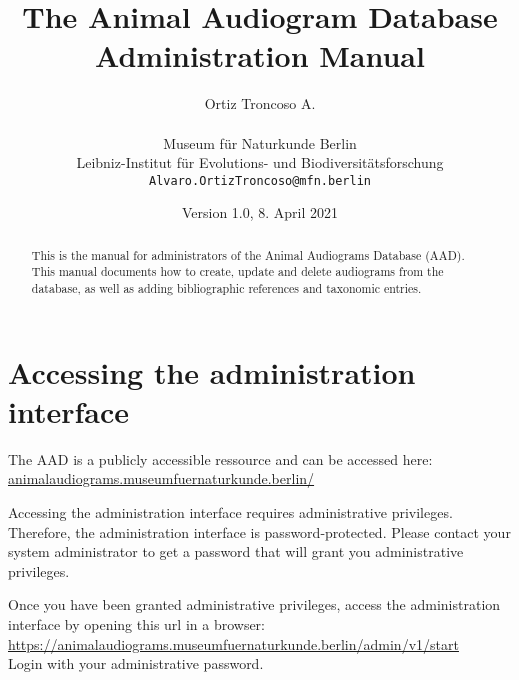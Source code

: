 \documentclass{article}
\begin{document}
\title{The Animal Audiogram Database Administration Manual}
\author{Ortiz Troncoso A.\\ \\
  Museum f{\"u}r Naturkunde Berlin\\Leibniz-Institut f{\"u}r Evolutions- und Biodiversitätsforschung\\
  \texttt{Alvaro.OrtizTroncoso@mfn.berlin}
}
\date{Version 1.0, 8. April 2021}

\maketitle

\begin{abstract}
  This is the manual for administrators of the Animal Audiograms Database (AAD). This manual documents how to create, update and delete audiograms from the database, as well as adding bibliographic references and taxonomic entries.
\end{abstract}

\newpage
\tableofcontents
\newpage

\section{Accessing the administration interface}
The AAD is a publicly accessible ressource and can be accessed here:\\ \url{animalaudiograms.museumfuernaturkunde.berlin/}

Accessing the administration interface requires administrative privileges. Therefore, the administration interface is password-protected. Please contact your system administrator to get a password that will grant you administrative privileges.

Once you have been granted administrative privileges, access the administration interface by opening this url in a browser:\\
\url{https://animalaudiograms.museumfuernaturkunde.berlin/admin/v1/start}\\
Login with your administrative password.


\end{document}

